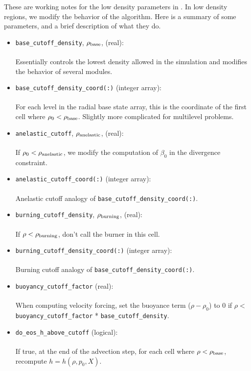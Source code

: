 These are working notes for the low density parameters in \maestro.
In low density regions, we modify the behavior of the algorithm.  Here
is a summary of some parameters, and a brief description of what they
do.
\begin{itemize}
\item {\tt base\_cutoff\_density}, $\rho_{\rm base}$, (real):\\ \\
Essentially controls the lowest density allowed in the simulation and modifies the behavior
of several modules.
\item {\tt base\_cutoff\_density\_coord(:)} (integer array):\\ \\
For each level in the radial base state array, this is the coordinate of the first cell
where $\rho_0 < \rho_{\rm base}$.  Slightly more complicated for multilevel problems.
\item {\tt anelastic\_cutoff}, $\rho_{\rm anelastic}$, (real):\\ \\
If $\rho_0 < \rho_{\rm anelastic}$, we modify the computation of $\beta_0$ in the
divergence constraint.
\item {\tt anelastic\_cutoff\_coord(:)} (integer array):\\ \\
Anelastic cutoff analogy of {\tt base\_cutoff\_density\_coord(:)}.
\item {\tt burning\_cutoff\_density}, $\rho_{\rm burning}$,  (real):\\ \\
If $\rho < \rho_{\rm burning}$, don't call the burner in this cell.
\item {\tt burning\_cutoff\_density\_coord(:)} (integer array):\\ \\
Burning cutoff analogy of {\tt base\_cutoff\_density\_coord(:)}.
\item {\tt buoyancy\_cutoff\_factor} (real):\\ \\
When computing velocity forcing, set the buoyance term ($\rho-\rho_0$) to 0 if 
$\rho < $ {\tt buoyancy\_cutoff\_factor} * {\tt base\_cutoff\_density}.
\item {\tt do\_eos\_h\_above\_cutoff} (logical):\\ \\
If {\rm true}, at the end of the advection step, for each cell where 
$\rho < \rho_{\rm base}$, recompute $h = h(\rho,p_0,X)$.
\end{itemize}


